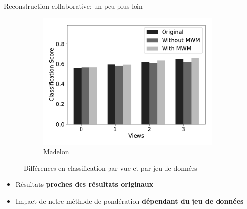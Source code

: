 \documentclass[hyperref={pdfpagelabels=false}]{beamer}
\begin{document}
\begin{frame}{Reconstruction collaborative: un peu plus loin}
\begin{figure}[!h]
\begin{subfigure}[c]{0.32\textwidth}
                \includegraphics[scale=.22]{cs_madelon}
                \caption{Madelon}
            \end{subfigure}
            \caption{Différences en classification par vue et par jeu de 
            données}
        \end{figure}
        \begin{itemize}
            \item Résultats \textbf{proches des résultats originaux}
            \item Impact de notre méthode de pondération \textbf{dépendant du 
                jeu de données}
        \end{itemize}
    \end{frame}
\end{document}
